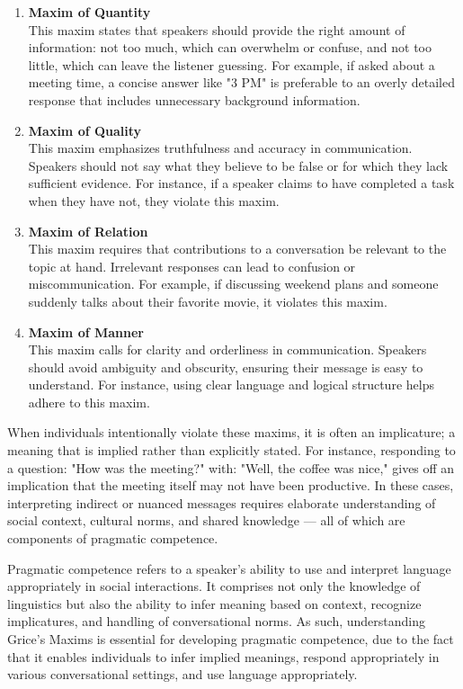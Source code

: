 \begin{enumerate}
    \item \textbf{Maxim of Quantity} \\
    This maxim states that speakers should provide the right amount of information: not too much, which can overwhelm or confuse, and not too little, which can leave the listener guessing. For example, if asked about a meeting time, a concise answer like "3 PM" is preferable to an overly detailed response that includes unnecessary background information.

    \item \textbf{Maxim of Quality} \\
    This maxim emphasizes truthfulness and accuracy in communication. Speakers should not say what they believe to be false or for which they lack sufficient evidence. For instance, if a speaker claims to have completed a task when they have not, they violate this maxim.

    \item \textbf{Maxim of Relation} \\
    This maxim requires that contributions to a conversation be relevant to the topic at hand. Irrelevant responses can lead to confusion or miscommunication. For example, if discussing weekend plans and someone suddenly talks about their favorite movie, it violates this maxim.

    \item \textbf{Maxim of Manner} \\
    This maxim calls for clarity and orderliness in communication. Speakers should avoid ambiguity and obscurity, ensuring their message is easy to understand. For instance, using clear language and logical structure helps adhere to this maxim.
\end{enumerate}


When individuals intentionally violate these maxims, it is often an implicature; a meaning that is implied rather than explicitly stated. For instance, responding to a question: "How was the meeting?" with: "Well, the coffee was nice," gives off an implication that the meeting itself may not have been productive. In these cases, interpreting indirect or nuanced messages requires elaborate understanding of social context, cultural norms, and shared knowledge --- all of which are components of pragmatic competence.

Pragmatic competence refers to a speaker's ability to use and interpret language appropriately in social interactions. It comprises not only the knowledge of linguistics but also the ability to infer meaning based on context, recognize implicatures, and handling of conversational norms. As such, understanding Grice's Maxims is essential for developing pragmatic competence, due to the fact that it enables individuals to infer implied meanings, respond appropriately in various conversational settings, and use language appropriately.

